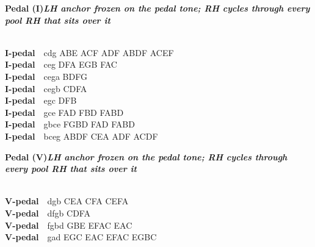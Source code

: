 \documentclass[letterpaper,12pt]{article}
\begin{document}
\begin{multicols}{4}
\noindent\colorbox{hdr4}{\begin{minipage}{\dimexpr\linewidth-2\fboxsep\relax}\raggedright\color{white}\bfseries Pedal (I)\quad\normalfont\itshape LH anchor frozen on the pedal tone; RH cycles through every pool RH that sits over it\end{minipage}}\\[0.1mm]
\noindent\hangindent=0.25in {\color{lhcol}\bfseries I-pedal}~~cdg {\ttfamily ABE  ACF  ADF  ABDF  ACEF}\\[0.1mm]
\noindent\hangindent=0.25in {\color{lhcol}\bfseries I-pedal}~~ceg {\ttfamily DFA  EGB  FAC}\\[0.1mm]
\noindent\hangindent=0.25in {\color{lhcol}\bfseries I-pedal}~~cega {\ttfamily BDFG}\\[0.1mm]
\noindent\hangindent=0.25in {\color{lhcol}\bfseries I-pedal}~~cegb {\ttfamily CDFA}\\[0.1mm]
\noindent\hangindent=0.25in {\color{lhcol}\bfseries I-pedal}~~egc {\ttfamily DFB}\\[0.1mm]
\noindent\hangindent=0.25in {\color{lhcol}\bfseries I-pedal}~~gce {\ttfamily FAD  FBD  FABD}\\[0.1mm]
\noindent\hangindent=0.25in {\color{lhcol}\bfseries I-pedal}~~gbce {\ttfamily FGBD  FAD  FABD}\\[0.1mm]
\noindent\hangindent=0.25in {\color{lhcol}\bfseries I-pedal}~~bceg {\ttfamily ABDF  CEA  ADF  ACDF}\\[0.1mm]
\vspace{1.5mm}
\noindent\colorbox{hdr4}{\begin{minipage}{\dimexpr\linewidth-2\fboxsep\relax}\raggedright\color{white}\bfseries Pedal (V)\quad\normalfont\itshape LH anchor frozen on the pedal tone; RH cycles through every pool RH that sits over it\end{minipage}}\\[0.1mm]
\noindent\hangindent=0.25in {\color{lhcol}\bfseries V-pedal}~~dgb {\ttfamily CEA  CFA  CEFA}\\[0.1mm]
\noindent\hangindent=0.25in {\color{lhcol}\bfseries V-pedal}~~dfgb {\ttfamily CDFA}\\[0.1mm]
\noindent\hangindent=0.25in {\color{lhcol}\bfseries V-pedal}~~fgbd {\ttfamily GBE  EFAC  EAC}\\[0.1mm]
\noindent\hangindent=0.25in {\color{lhcol}\bfseries V-pedal}~~gad {\ttfamily EGC  EAC  EFAC  EGBC}\\[0.1mm]

\end{multicols}
\end{document}
